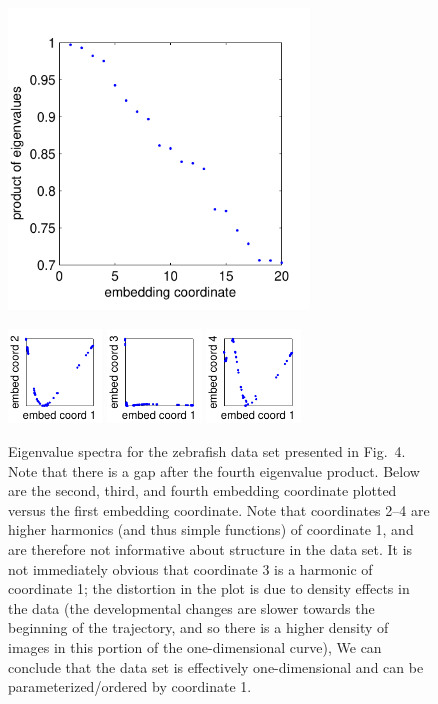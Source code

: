 \documentclass[10pt,twocolumn]{article}
\newcommand{\fig}[0]{Fig.}
\begin{document}
\begin{figure}
\includegraphics[width=8cm]{zebrafish_eval_spectrum}

\includegraphics[width=2.5cm]{zebrafish_evec_corr1}
\includegraphics[width=2.5cm]{zebrafish_evec_corr2}
\includegraphics[width=2.5cm]{zebrafish_evec_corr3}
\caption{Eigenvalue spectra for the zebrafish data set presented in \fig~4. Note that there is a gap after the fourth eigenvalue product. Below are the second, third, and fourth embedding coordinate plotted versus the first embedding coordinate. Note that coordinates 2--4 are higher harmonics (and thus simple functions) of coordinate 1, and are therefore not informative about structure in the data set.  It is not immediately obvious that coordinate 3 is a harmonic of coordinate 1; the distortion in the plot is due to density effects in the data (the developmental changes are slower towards the beginning of the trajectory, and so there is a higher density of images in this portion of the one-dimensional curve), We can conclude that the data set is effectively one-dimensional and can be parameterized/ordered by coordinate 1.}
\end{figure}
\end{document}
